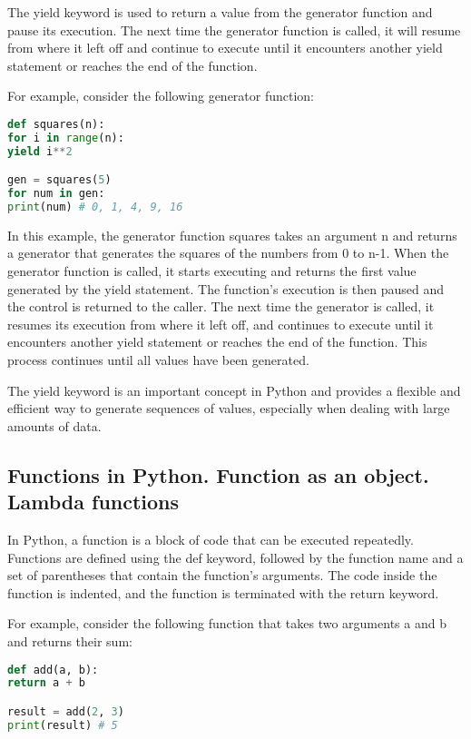 \documentclass[12pt, a4paper, oneside]{article}
\begin{document}
The yield keyword is used to return a value from the generator function and pause its execution. The next time the generator function is called, it will resume from where it left off and continue to execute until it encounters another yield statement or reaches the end of the function.

For example, consider the following generator function:

\begin{lstlisting}[language=Python, frame=single]
def squares(n):
for i in range(n):
yield i**2

gen = squares(5)
for num in gen:
print(num) # 0, 1, 4, 9, 16
\end{lstlisting}

In this example, the generator function squares takes an argument n and returns a generator that generates the squares of the numbers from 0 to n-1. When the generator function is called, it starts executing and returns the first value generated by the yield statement. The function's execution is then paused and the control is returned to the caller. The next time the generator is called, it resumes its execution from where it left off, and continues to execute until it encounters another yield statement or reaches the end of the function. This process continues until all values have been generated.

The yield keyword is an important concept in Python and provides a flexible and efficient way to generate sequences of values, especially when dealing with large amounts of data.




\subsection{ Functions in Python. Function as an object. Lambda functions }
In Python, a function is a block of code that can be executed repeatedly. Functions are defined using the def keyword, followed by the function name and a set of parentheses that contain the function's arguments. The code inside the function is indented, and the function is terminated with the return keyword.

For example, consider the following function that takes two arguments a and b and returns their sum:

\begin{lstlisting}[language=Python, frame=single]
def add(a, b):
return a + b

result = add(2, 3)
print(result) # 5
\end{lstlisting}
\end{document}

